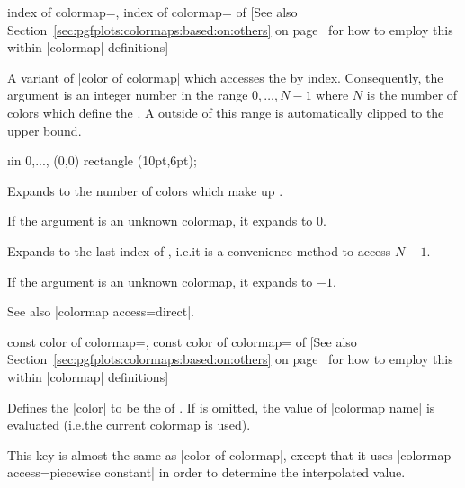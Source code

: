 \begin{pgfplotskeylist}{%
    index of colormap=,
    index of colormap= of %
}
    [See also Section~\ref{sec:pgfplots:colormaps:based:on:others} on
    page~\pageref{sec:pgfplots:colormaps:based:on:others} for how to employ
    this within |colormap| definitions]

    A variant of |color of colormap| which accesses the  by
    index. Consequently, the argument  is an integer number in the
    range $0,\dotsc,N-1$ where $N$ is the number of colors which define the
    . A  outside of this range is automatically
    clipped to the upper bound.

\begin{codeexample}[]
    \pgfplotsset{colormap/jet}
\foreach \i in {
    0,...,
}{
    \tikz\fill [
        index of colormap={\i of jet},
        thick,
        draw=.!60!black,
    ] (0,0) rectangle (10pt,6pt);
}
\end{codeexample}

    \begin{command}{\pgfplotscolormapsizeof{}}
        Expands to the number of colors which make up .

        If the argument  is an unknown colormap, it expands
        to $0$.
    \end{command}

    \begin{command}{\pgfplotscolormaplastindexof{}}
        Expands to the last index of , i.e.\@ it is a
        convenience method to access $N-1$.

        If the argument  is an unknown colormap, it expands
        to $-1$.
    \end{command}

    See also |colormap access=direct|.
\end{pgfplotskeylist}

\begin{pgfplotskeylist}{%
    const color of colormap=,
    const color of colormap= of %
}
    [See also Section~\ref{sec:pgfplots:colormaps:based:on:others} on
    page~\pageref{sec:pgfplots:colormaps:based:on:others} for how to employ
    this within |colormap| definitions]

    Defines the \tikzname{} |color| to be the  of . If  is omitted, the value of |colormap name| is
    evaluated (i.e.\@ the current colormap is used).

    This key is almost the same as |color of colormap|, except that it uses
    |colormap access=piecewise constant| in order to determine the interpolated
    value.
\end{pgfplotskeylist}


